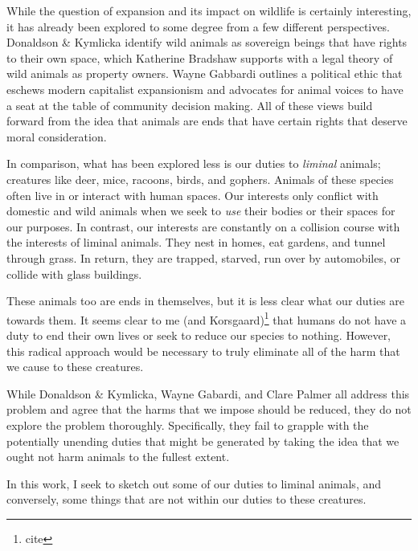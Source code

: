 		While the question of expansion and its impact on wildlife is certainly
		interesting, it has already been explored to some degree from a few
		different perspectives. Donaldson \& Kymlicka identify wild animals as
		sovereign beings that have rights to their own space, which Katherine
		Bradshaw supports with a legal theory of wild animals as property
		owners. Wayne Gabbardi outlines a political ethic that eschews modern
		capitalist expansionism and advocates for animal voices to have a seat
		at the table of community decision making. All of these views build
		forward from the idea that animals are ends that have certain rights
		that deserve moral consideration.

		In comparison, what has been explored less is our duties to
		\emph{liminal} animals; creatures like deer, mice, racoons, birds,
		and gophers.  Animals of these species often live in or interact with
		human spaces.  Our interests only conflict with domestic and wild
		animals when we seek to \emph{use} their bodies or their spaces for our
		purposes. In contrast, our interests are constantly on a collision
		course with the interests of liminal animals. They nest in homes, eat
		gardens, and tunnel through grass. In return, they are trapped,
		starved, run over by automobiles, or collide with glass buildings.

		These animals too are ends in themselves, but it is less clear what our
		duties are towards them. It seems clear to me (and
		Korsgaard)\footnote{cite} that humans do not have a duty to end their
		own lives or seek to reduce our species to nothing. However, this
		radical approach would be necessary to truly eliminate all of the harm
		that we cause to these creatures.

		While Donaldson \& Kymlicka, Wayne Gabardi, and Clare Palmer all
		address this problem and agree that the harms that we impose should be
		reduced, they do not explore the problem thoroughly.  Specifically,
		they fail to grapple with the potentially unending duties that might be
		generated by taking the idea that we ought not harm animals to the
		fullest extent.

		In this work, I seek to sketch out some of our duties to liminal
		animals, and conversely, some things that are not within our duties to
		these creatures.

